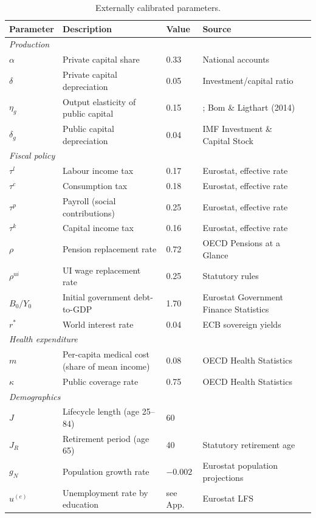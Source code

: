 \begin{table}[H]
\centering
\small
\caption{Externally calibrated parameters.}
\label{tab:external}
\begin{tabular}{lllll}
\toprule
Parameter & Description & Value & Source \\
\midrule
\multicolumn{4}{l}{\textit{Production}} \\
$\alpha$ & Private capital share & 0.33 & National accounts \\
$\delta$ & Private capital depreciation & 0.05 & Investment/capital ratio \\
$\eta_g$ & Output elasticity of public capital & 0.15 & \cite{BaxterKing_AER93}; Bom \& Ligthart (2014) \\
$\delta_g$ & Public capital depreciation & 0.04 & IMF Investment \& Capital Stock \\
\midrule
\multicolumn{4}{l}{\textit{Fiscal policy}} \\
$\tau^l$ & Labour income tax & 0.17 & Eurostat, effective rate \\
$\tau^c$ & Consumption tax & 0.18 & Eurostat, effective rate \\
$\tau^p$ & Payroll (social contributions) & 0.25 & Eurostat, effective rate \\
$\tau^k$ & Capital income tax & 0.16 & Eurostat, effective rate \\
$\rho$ & Pension replacement rate & 0.72 & OECD Pensions at a Glance \\
$\rho^{ui}$ & UI wage replacement rate & 0.25 & Statutory rules \\
$B_0/Y_0$ & Initial government debt-to-GDP & 1.70 & Eurostat Government Finance Statistics \\
$r^*$ & World interest rate & 0.04 & ECB sovereign yields \\
\midrule
\multicolumn{4}{l}{\textit{Health expenditure}} \\
$m$ & Per-capita medical cost (share of mean income) & 0.08 & OECD Health Statistics \\
$\kappa$ & Public coverage rate & 0.75 & OECD Health Statistics \\
\midrule
\multicolumn{4}{l}{\textit{Demographics}} \\
$J$ & Lifecycle length (age 25--84) & 60 & \\
$J_R$ & Retirement period (age 65) & 40 & Statutory retirement age \\
$g_N$ & Population growth rate & $-0.002$ & Eurostat population projections \\
$u^{(e)}$ & Unemployment rate by education & see App. & Eurostat LFS \\
\bottomrule
\end{tabular}
\end{table}

